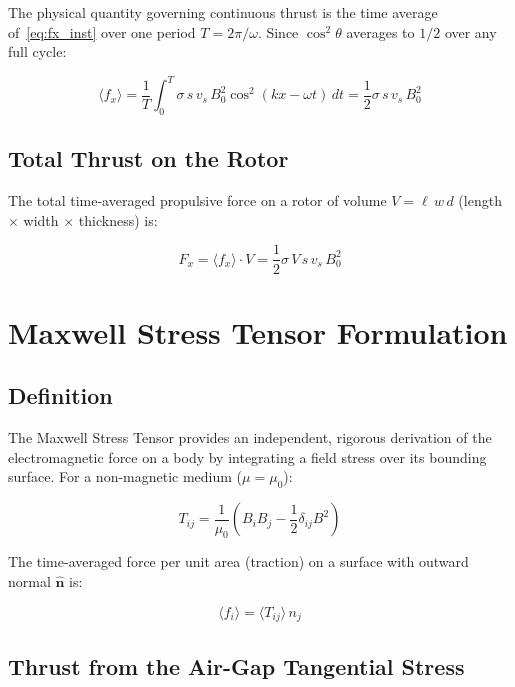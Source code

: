 \documentclass[12pt, a4paper]{article}
\theoremstyle{plain}
\theoremstyle{definition}
\newcommand{\nhat}{\hat{\mathbf{n}}}
\newcommand{\sig}{\sigma}
\newcommand{\muZ}{\mu_0}
\newcommand{\avg}[1]{\langle #1 \rangle}
\begin{document}
The physical quantity governing continuous thrust is the time average of~\eqref{eq:fx_inst}
over one period $T = 2\pi/\omega$. Since $\cos^2\theta$ averages to $1/2$ over any
full cycle:

\begin{equation}
  \avg{f_x} = \frac{1}{T}\int_0^T \sig\, s\, v_s\, B_0^2\cos^2(kx-\omega t)\,dt
  = \frac{1}{2}\sig\, s\, v_s\, B_0^2
  \label{eq:fx_avg}
\end{equation}

\subsection{Total Thrust on the Rotor}

The total time-averaged propulsive force on a rotor of volume $V = \ell\, w\, d$
(length $\times$ width $\times$ thickness) is:

\begin{equation}
  F_x = \avg{f_x} \cdot V = \frac{1}{2}\sig\, V\, s\, v_s\, B_0^2
  \label{eq:Fx_total}
\end{equation}

\section{Maxwell Stress Tensor Formulation}
\label{sec:mst}

\subsection{Definition}

The Maxwell Stress Tensor provides an independent, rigorous derivation of the
electromagnetic force on a body by integrating a field stress over its bounding
surface. For a non-magnetic medium ($\mu = \muZ$):

\begin{equation}
  T_{ij} = \frac{1}{\muZ}\left(B_i B_j - \frac{1}{2}\delta_{ij}B^2\right)
  \label{eq:MST}
\end{equation}

The time-averaged force per unit area (traction) on a surface with outward
normal $\nhat$ is:

\begin{equation}
  \avg{f_i} = \avg{T_{ij}}\,n_j
\end{equation}

\subsection{Thrust from the Air-Gap Tangential Stress}
\end{document}
